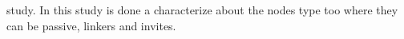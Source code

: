 study. In this study \cite{Kumar:2006} is done a characterize about the nodes type too where they can be passive, 
linkers and invites.
\\
\cite{Sun:2012} \\
\cite{Ducheneaut:2007} \\
\cite{Backstrom:2006} \\
\cite{Patil:2012} \\
\cite{Lopes:2011} \\
\cite{Sachan:2012} \\
\cite{Leskovec:2005} \\
\cite{Xu:2010} \\
\cite{Willinger:2010} \\
\cite{Wu:2009} \\
\cite{Huang:2008} \\
\cite{Garg:2009} \\
\cite{Leskovec:2008} \\




